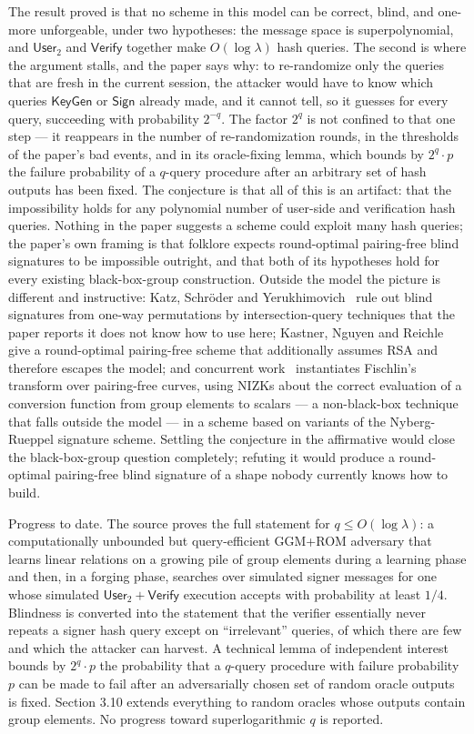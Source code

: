 \documentclass{conjura-conjecture}
\newcommand{\KeyGen}{\mathsf{KeyGen}}
\newcommand{\Usertwo}{\mathsf{User}_2}
\newcommand{\Sig}{\mathsf{Sign}}
\newcommand{\Ver}{\mathsf{Verify}}
\begin{document}
The result proved is that no scheme in this model can be correct, blind,
and one-more unforgeable, under two hypotheses: the message space is
superpolynomial, and $\Usertwo$ and $\Ver$ together make $O(\log\lambda)$
hash queries. The second is where the argument stalls, and the paper
says why: to re-randomize only the queries that are fresh in the current
session, the attacker would have to know which queries $\KeyGen$ or
$\Sig$ already made, and it cannot tell, so it guesses for every query,
succeeding with probability $2^{-q}$. The factor $2^{q}$ is not confined
to that one step --- it reappears in the number of re-randomization
rounds, in the thresholds of the paper's bad events, and in its
oracle-fixing lemma, which bounds by $2^{q}\cdot p$ the failure
probability of a $q$-query procedure after an arbitrary set of hash
outputs has been fixed. The conjecture is that all of this is an
artifact: that the impossibility holds for any polynomial number of
user-side and verification hash queries. Nothing in the paper suggests a
scheme could exploit many hash queries; the paper's own framing is that
folklore expects round-optimal pairing-free blind signatures to be
impossible outright, and that both of its hypotheses hold for every
existing black-box-group construction. Outside the model the picture is
different and instructive: Katz, Schr\"oder and
Yerukhimovich~\cite{KSY11} rule out blind signatures from one-way
permutations by intersection-query techniques that the paper reports it
does not know how to use here; Kastner, Nguyen and Reichle~\cite{KNR24}
give a round-optimal pairing-free scheme that additionally assumes RSA
and therefore escapes the model; and concurrent work~\cite{KTZ26}
instantiates Fischlin's transform over pairing-free curves, using NIZKs
about the correct evaluation of a conversion function from group
elements to scalars --- a non-black-box technique that falls outside the
model --- in a scheme based on variants of the Nyberg-Rueppel signature
scheme. Settling the conjecture in the affirmative would close the
black-box-group question completely; refuting it would produce a
round-optimal pairing-free blind signature of a shape nobody currently
knows how to build.

Progress to date. The source proves the full statement for
$q\le O(\log\lambda)$: a computationally unbounded but query-efficient
GGM+ROM adversary that learns linear relations on a growing pile of
group elements during a learning phase and then, in a forging phase,
searches over simulated signer messages for one whose simulated
$\Usertwo{+}\Ver$ execution accepts with probability at least $1/4$.
Blindness is converted into the statement that the verifier essentially
never repeats a signer hash query except on ``irrelevant'' queries, of
which there are few and which the attacker can harvest. A technical
lemma of independent interest bounds by $2^{q}\cdot p$ the probability
that a $q$-query procedure with failure probability $p$ can be made to
fail after an adversarially chosen set of random oracle outputs is
fixed. Section 3.10 extends everything to random oracles whose outputs
contain group elements. No progress toward superlogarithmic $q$ is
reported.
\end{document}
